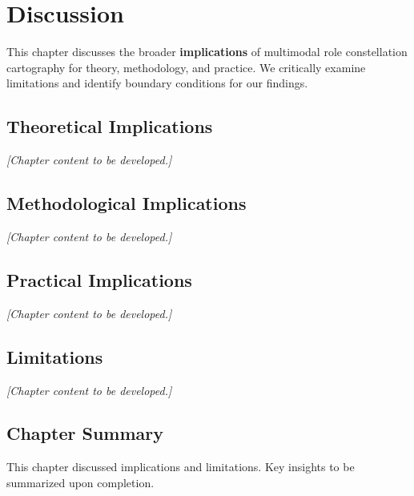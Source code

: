 \documentclass[../main.tex]{subfiles}
\begin{document}
\chapter{Discussion}
\margintoc

\begin{chapteroverview}
This chapter discusses the broader \textbf{implications} of multimodal role constellation cartography for theory, methodology, and practice. We critically examine limitations and identify boundary conditions for our findings.
\end{chapteroverview}

\section{Theoretical Implications}

\textit{[Chapter content to be developed.]}

\section{Methodological Implications}

\textit{[Chapter content to be developed.]}

\section{Practical Implications}

\textit{[Chapter content to be developed.]}

\section{Limitations}

\textit{[Chapter content to be developed.]}

\section{Chapter Summary}

\begin{summarybox}
This chapter discussed implications and limitations. Key insights to be summarized upon completion.
\end{summarybox}
\end{document}

